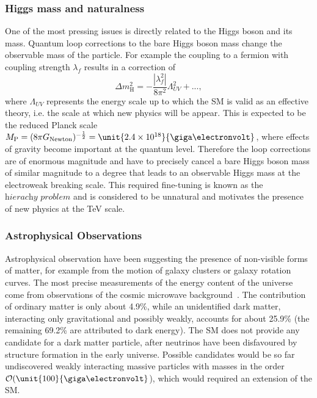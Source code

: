 \subsubsection*{Higgs mass and naturalness}
One of the most pressing issues is directly related to the Higgs boson and its mass. Quantum loop corrections to the bare Higgs boson mass change the observable mass of the particle. For example the coupling to a fermion with coupling strength $\lambda_f$ results in a correction of
\begin{equation}
\Delta m_{\mathrm{H}}^2 = -\frac{|\lambda_f^2|}{8\pi^2}\Lambda_{UV}^2 + ...,
\end{equation}
where $\Lambda_{UV}$ represents the energy scale up to which the SM is valid as an effective theory, i.e. the scale at which new physics will be appear. This is expected to be the reduced Planck scale $M_\mathrm{P} = (8\pi G_{\mathrm{Newton}})^{-\frac{1}{2}} = \unit{2.4\times 10^{18}}{\giga\electronvolt}$, where effects of gravity become important at the quantum level. Therefore the loop corrections are of enormous magnitude and have to precisely cancel a bare Higgs boson mass of similar magnitude to a degree that leads to an observable Higgs mass at the electroweak breaking scale. This required fine-tuning is known as the  $\textit{hierachy problem}$ and is considered to be unnatural and motivates the presence of new physics at the TeV scale.

\subsubsection*{Astrophysical Observations}
Astrophysical observation have been suggesting the presence of non-visible forms of matter, for example from the motion of galaxy clusters or galaxy rotation curves. The most precise measurements of the energy content of the universe come from observations of the cosmic microwave background~\cite{Adam:2015rua}. The contribution of ordinary matter is only about 4.9\%, while an unidentified dark matter, interacting only gravitational and possibly weakly, accounts for about 25.9\% (the remaining 69.2\% are attributed to dark energy). The SM does not provide any candidate for a dark matter particle, after neutrinos have been disfavoured by structure formation in the early universe. Possible candidates would be so far undiscovered weakly interacting massive particles with masses in the order $\mathcal{O}(\unit{100}{\giga\electronvolt}$), which would required an extension of the SM. 

